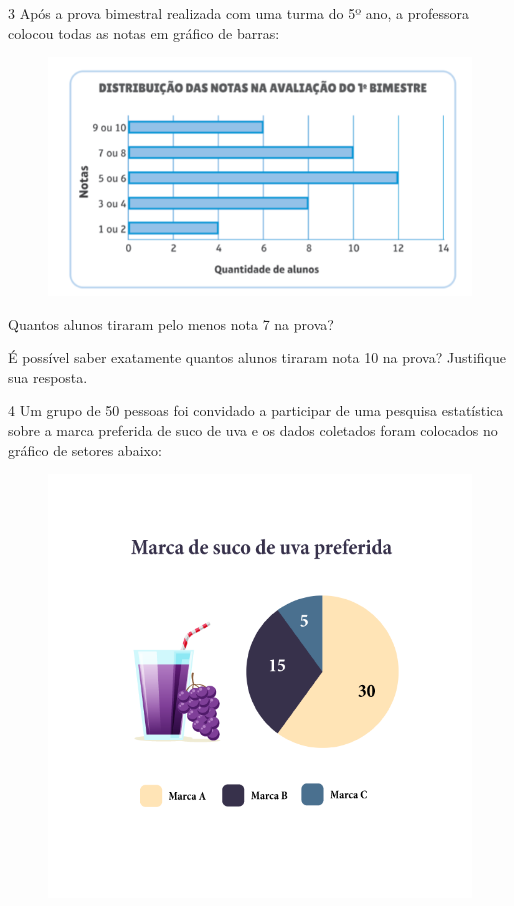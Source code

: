 \num{3} Após a prova bimestral realizada com uma turma do 5º ano, a
professora colocou todas as notas em gráfico de barras:

\begin{figure}[htpb!]
\includegraphics[width=.5\textwidth]{./imgs/mat18.png}
\end{figure}

\begin{escolha}
\item
  Quantos alunos tiraram pelo menos nota 7 na prova?


\item
  É possível saber exatamente quantos alunos tiraram nota 10 na prova?
  Justifique sua resposta.

\end{escolha}

\num{4} Um grupo de 50 pessoas foi convidado a participar de uma pesquisa
estatística sobre a marca preferida de suco de uva e os dados coletados
foram colocados no gráfico de setores abaixo:

\begin{figure}[htpb!]
\includegraphics[width=\textwidth]{../ilustracoes/MAT5/SAEB_5ANO_MAT_figura103.png}
\end{figure}


